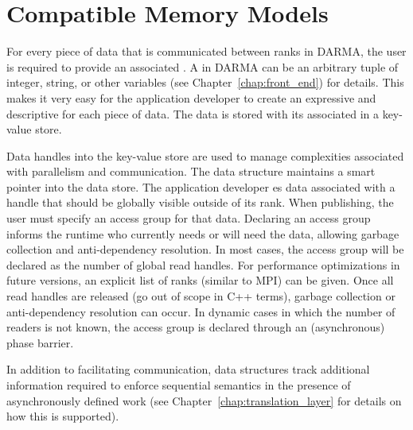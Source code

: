 
\section{Compatible Memory Models}
\label{sec:mem_model}

For every piece of data that is communicated between \glspl{rank} in DARMA, the
user is required to provide an associated .  
A  in DARMA can be an arbitrary \gls{tuple} of integer, string, or other variables (see Chapter~\ref{chap:front_end}) for details.
This makes it very easy for the application developer to create an expressive
and descriptive  for each piece of data.
The data is stored with its associated  in a \gls{key-value
store}.  


Data \glspl{handle} into the \gls{key-value store} are used to manage
complexities associated with parallelism and communication.  
The  data structure maintains a smart pointer into the data
store.  The application developer es data associated with a
handle that should be globally visible
outside of its \gls{rank}.  When publishing, the user must specify an \gls{access group}
for that data.  Declaring an access group informs the runtime who currently needs or will need the data,  
allowing garbage collection and \gls{anti-dependency} resolution.
In most cases, the access group will be declared as the number of global read handles.
For performance optimizations in future versions, an explicit list of ranks (similar to MPI) can be given.
Once all read handles are released (go out of scope in C++ terms), garbage collection or anti-dependency resolution can occur.
In dynamic cases in which the number of readers is not known,
the access group is declared through an (asynchronous) phase barrier.

In addition to facilitating communication,  data structures track additional information required 
to enforce \gls{sequential semantics} in the presence of asynchronously defined
work (see Chapter~\ref{chap:translation_layer} for details on how this is supported).







